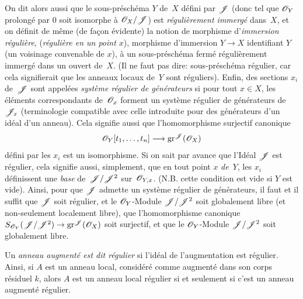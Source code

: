 \begin{remarques}
On
dit alors aussi que le sous-pr\'esch\'ema $Y$ de~$X$ d\'efini
par $\cal{J}$ (donc tel que $\cal{O}_Y$ prolong\'e par $0$ soit
isomorphe \`a $\cal{O}_X/\cal{J}$) est \emph{régulièrement
immergé}
dans~$X$, et on d\'efinit de m\^eme (de fa\c con
\'evidente) la notion de morphisme d'\emph{immersion
régulière},
(\resp \emph{régulière en un point $x$}), morphisme
d'immersion $Y\to X$ identifiant $Y$ (\resp un voisinage convenable de
$x$), \`a un sous-pr\'esch\'ema ferm\'e r\'eguli\`erement
immerg\'e dans un ouvert de~$X$. (Il ne faut pas dire:
sous-pr\'esch\'ema r\'egulier, car cela signifierait que les
anneaux locaux de~$Y$ sont r\'eguliers). Enfin, des sections $x_i$
de~$\cal{J}$ sont appel\'ees \emph{système régulier de
générateurs} si pour tout $x\in X$, les \'el\'ements
correspondants de~$\cal{O}_x$ forment un syst\`eme r\'egulier de
g\'en\'erateurs de~$\cal{J}_x$ (terminologie compatible avec celle
introduite pour des g\'en\'erateurs d'un id\'eal d'un
anneau). Cela signifie aussi que l'homomorphisme surjectif canonique
$$
\cal{O}_Y[t_1,\dots,t_n] \to \gr^{\cal{J}} (\cal{O}_X)
$$
d\'efini par les $x_i$ est un isomorphisme. Si on sait par avance
que l'Id\'eal $\cal{J}$ est r\'egulier, cela signifie aussi,
simplement, que en tout point $x$ \emph{de~$Y$}, les $x_i$
d\'efinissent une \emph{base} de~$\cal{J}/\cal{J}^2$ sur~$\cal{O}_{Y,x}$. (N.B. cette condition est vide si $Y$ est
vide). Ainsi, pour que $\cal{J}$ admette un syst\`eme r\'egulier
de g\'en\'erateurs, il faut et il suffit que $\cal{J}$ soit
r\'egulier, et le $\cal{O}_Y$-Module $\cal{J} /\cal{J}^2$ soit
globalement libre (et non-seulement localement libre), \ie que
l'homomorphisme canonique $S_{\cal{O}_Y}(\cal{J}/\cal{J}^2) \to
\gr^{\cal{J}} (\cal{O}_X)$ soit surjectif, et que le
$\cal{O}_Y$-Module $\cal{J}/\cal{J}^2$ soit globalement libre.

Un \emph{anneau augmenté est dit régulier}
si l'id\'eal de l'augmentation est r\'egulier. Ainsi, si $A$ est
un anneau local, consid\'er\'e comme augment\'e dans son corps
r\'esiduel $k$, alors $A$ est un anneau local r\'egulier si et
seulement si c'est un anneau augment\'e r\'egulier.


\end{remarques}
